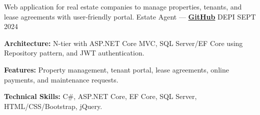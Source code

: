 \begin{cventries}
\cventry
    {Web application for real estate companies to manage properties, tenants, and lease agreements with user-friendly portal.} %
    {Estate Agent — \href{https://github.com/ibrhmahmd/RealEstate}{\color{midnightblue}\textbf{GitHub}} \textrm{\faArrowRight}} %
    {DEPI} %
    {SEPT 2024} %
    {
      \begin{cvitems} %
        \item \textbf{Architecture:}{ N-tier with ASP.NET Core MVC, SQL Server/EF Core using Repository pattern, and JWT authentication.}
        \item \textbf{Features:}{ Property management, tenant portal, lease agreements, online payments, and maintenance requests.}
        \item \textbf{Technical Skills:}{ C#, ASP.NET Core, EF Core, SQL Server, HTML/CSS/Bootstrap, jQuery.}
      \end{cvitems}
    }





\end{cventries}
